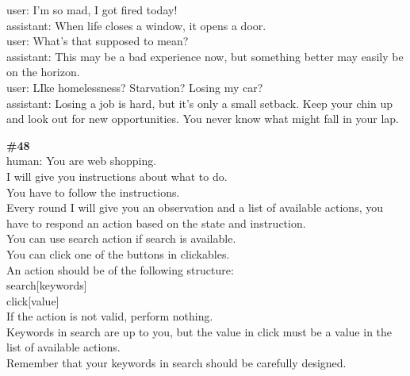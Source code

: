 \documentclass[10pt]{article}
\begin{document}
\begin{Form}
\begin{tcolorbox}[colback=convbg,colframe=itemframe,boxrule=0.8pt,arc=2pt,breakable,left=6pt,right=6pt,top=5pt,bottom=5pt]
{user: I'm so mad, I got fired today! \\[2pt]
assistant: When life closes a window, it opens a door. \\[2pt]
user: What's that supposed to mean? \\[2pt]
assistant: This may be a bad experience now, but something better may easily be on the horizon. \\[2pt]
user: LIke homelessness?  Starvation?  Losing my car? \\[2pt]
assistant: Losing a job is hard, but it's only a small setback.  Keep your chin up and look out for new opportunities.  You never know what might fall in your lap.}
\end{tcolorbox}
\vspace{-1pt}
\CheckBox[name=q47c,width=1.6ex,height=1.6ex,bordercolor={0.45 0.45 0.45}]{~\textcolor{cbox}{COMPACT}}\quad
\CheckBox[name=q47d,width=1.6ex,height=1.6ex,bordercolor={0.45 0.45 0.45}]{~\textcolor{dbox}{DIFFUSE}}\quad
\CheckBox[name=q47n,width=1.6ex,height=1.6ex,bordercolor={0.45 0.45 0.45}]{~\textcolor{nbox}{NONE}}
\vspace{8pt}
\begin{tcolorbox}[colback=convbg,colframe=itemframe,boxrule=0.8pt,arc=2pt,breakable,left=6pt,right=6pt,top=5pt,bottom=5pt]
{\footnotesize\textbf{\#48}}\\[3pt]
{\footnotesize human: You are web shopping. \\[2pt]
I will give you instructions about what to do. \\[2pt]
You have to follow the instructions. \\[2pt]
Every round I will give you an observation and a list of available actions, you have to respond an action based on the state and instruction. \\[2pt]
You can use search action if search is available. \\[2pt]
You can click one of the buttons in clickables. \\[2pt]
An action should be of the following structure: \\[2pt]
search[keywords] \\[2pt]
click[value] \\[2pt]
If the action is not valid, perform nothing. \\[2pt]
Keywords in search are up to you, but the value in click must be a value in the list of available actions. \\[2pt]
Remember that your keywords in search should be carefully designed. \\[2pt]
}
\end{tcolorbox}
\end{Form}
\end{document}
